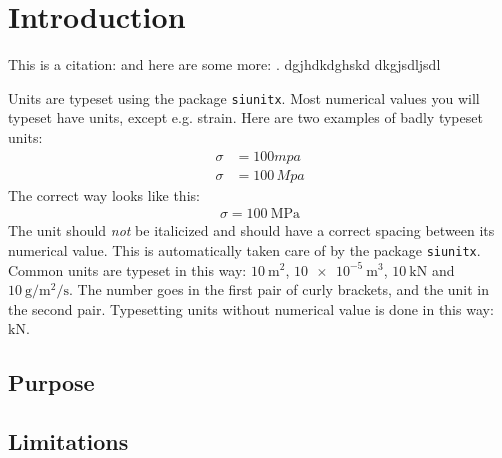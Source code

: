 \chapter{Introduction}
This is a citation: \cite{kzfmodel_hanjalic2004} and here are some more: \cite{matlab:ode,numerical_analysis_of_de_aiserles}. dgjhdkdghskd dkgjsdljsdl


Units are typeset using the package \texttt{siunitx}. Most numerical values you will typeset have units, except e.g. strain. Here are two examples of badly typeset units: 
\begin{align*}
\sigma &= 100 mpa \\
\sigma &= 100\, Mpa
\end{align*}
The correct way looks like this:
\begin{align*}
\sigma = \SI{100}{\mega\pascal}
\end{align*}
The unit should \emph{not} be italicized and should have a correct spacing between its numerical value. This is automatically taken care of by the package \texttt{siunitx}. Common units are typeset in this way: $\SI{10}{\meter\squared}$, $\SI{10e-5}{\meter\cubed}$, $\SI{10}{\kilo\newton}$ and $\SI{10}{\gram\per\meter\squared\per\second}$. The number goes in the first pair of curly brackets, and the unit in the second pair. Typesetting units without numerical value is done in this way: $\si{\kilo\newton}$.

\section{Purpose}
\lipsum


\section{Limitations}
\lipsum

